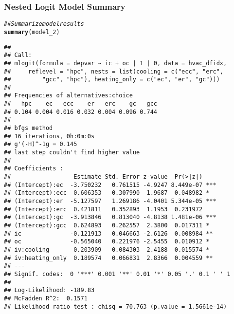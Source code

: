 \documentclass{beamer}\usepackage[]{graphicx}\usepackage[]{xcolor}
\makeatletter
\newcommand{\hlcom}[1]{\textcolor[rgb]{0.678,0.584,0.686}{\textit{#1}}}%
\newcommand{\hlstd}[1]{\textcolor[rgb]{0.345,0.345,0.345}{#1}}%
\newcommand{\hlkwd}[1]{\textcolor[rgb]{0.737,0.353,0.396}{\textbf{#1}}}%
\newenvironment{kframe}{%
 \def\at@end@of@kframe{}%
 \ifinner\ifhmode%
  \def\at@end@of@kframe{\end{minipage}}%
  \begin{minipage}{\columnwidth}%
 \fi\fi%
 \def\FrameCommand##1{\hskip\@totalleftmargin \hskip-\fboxsep
 \colorbox{shadecolor}{##1}\hskip-\fboxsep
     \hskip-\linewidth \hskip-\@totalleftmargin \hskip\columnwidth}%
 \MakeFramed {\advance\hsize-\width
   \@totalleftmargin\z@ \linewidth\hsize
   \@setminipage}}%
 {\par\unskip\endMakeFramed%
 \at@end@of@kframe}
\newenvironment{knitrout}{}{} %
\makeatother
\begin{document}
\begin{frame}[fragile]\frametitle{Nested Logit Model Summary}
    \vspace{1ex}
\begin{knitrout}\tiny
{}\color{fgcolor}\begin{kframe}
\begin{alltt}
\hlcom{## Summarize model results}
\hlkwd{summary}\hlstd{(model_2)}
\end{alltt}
\begin{verbatim}
## 
## Call:
## mlogit(formula = depvar ~ ic + oc | 1 | 0, data = hvac_dfidx, 
##     reflevel = "hpc", nests = list(cooling = c("ecc", "erc", 
##         "gcc", "hpc"), heating_only = c("ec", "er", "gc")))
## 
## Frequencies of alternatives:choice
##   hpc    ec   ecc    er   erc    gc   gcc 
## 0.104 0.004 0.016 0.032 0.004 0.096 0.744 
## 
## bfgs method
## 16 iterations, 0h:0m:0s 
## g'(-H)^-1g = 0.145 
## last step couldn't find higher value 
## 
## Coefficients :
##                  Estimate Std. Error z-value  Pr(>|z|)    
## (Intercept):ec  -3.750232   0.761515 -4.9247 8.449e-07 ***
## (Intercept):ecc  0.606353   0.307990  1.9687  0.048982 *  
## (Intercept):er  -5.127597   1.269186 -4.0401 5.344e-05 ***
## (Intercept):erc  0.421811   0.352893  1.1953  0.231972    
## (Intercept):gc  -3.913846   0.813040 -4.8138 1.481e-06 ***
## (Intercept):gcc  0.624893   0.262557  2.3800  0.017311 *  
## ic              -0.121913   0.046663 -2.6126  0.008984 ** 
## oc              -0.565040   0.221976 -2.5455  0.010912 *  
## iv:cooling       0.203909   0.084303  2.4188  0.015574 *  
## iv:heating_only  0.189574   0.066831  2.8366  0.004559 ** 
## ---
## Signif. codes:  0 '***' 0.001 '**' 0.01 '*' 0.05 '.' 0.1 ' ' 1
## 
## Log-Likelihood: -189.83
## McFadden R^2:  0.1571 
## Likelihood ratio test : chisq = 70.763 (p.value = 1.5661e-14)
\end{verbatim}
\end{kframe}
\end{knitrout}
\end{frame}
\end{document}
